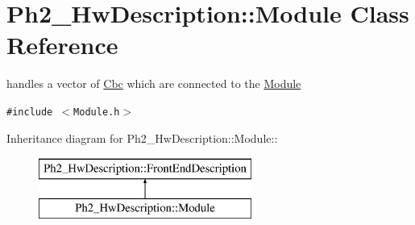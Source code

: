 \hypertarget{class_ph2___hw_description_1_1_module}{
\section{Ph2\_\-Hw\-Description::Module Class Reference}
\label{class_ph2___hw_description_1_1_module}
}
handles a vector of \hyperlink{class_ph2___hw_description_1_1_cbc}{Cbc} which are connected to the \hyperlink{class_ph2___hw_description_1_1_module}{Module}  


{\tt \#include $<$Module.h$>$}

Inheritance diagram for Ph2\_\-Hw\-Description::Module::\begin{figure}[H]
\begin{center}
\leavevmode
\includegraphics[height=2cm]{class_ph2___hw_description_1_1_module}
\end{center}
\end{figure}
